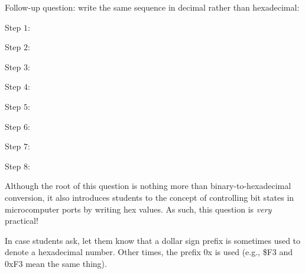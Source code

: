 \vskip 10pt

Follow-up question: write the same sequence in decimal rather than hexadecimal:

\medskip
\goodbreak
\item{Step $1$:}
\item{Step $2$:}
\item{Step $3$:}
\item{Step $4$:}
\item{Step $5$:}
\item{Step $6$:}
\item{Step $7$:}
\item{Step $8$:}
\medskip







Although the root of this question is nothing more than binary-to-hexadecimal conversion, it also introduces students to the concept of controlling bit states in microcomputer ports by writing hex values.  As such, this question is {\it very} practical!

In case students ask, let them know that a dollar sign prefix is sometimes used to denote a hexadecimal number.  Other times, the prefix 0x is used (e.g., \$F3 and 0xF3 mean the same thing).




